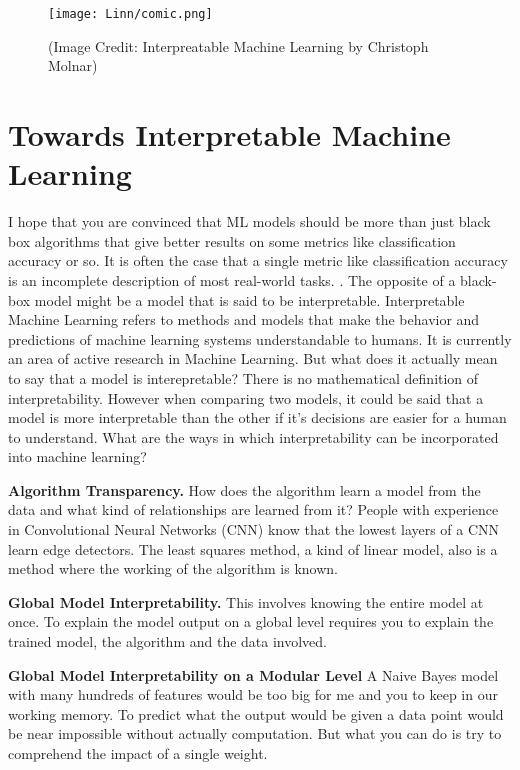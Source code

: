 \documentclass{../template/texnote}
\begin{document}
\begin{figure}[htpb]
    \texttt{[image: Linn/comic.png]}
    \caption{(Image Credit: Interpreatable Machine Learning by Christoph Molnar)}
    \label{fig:comic}
\end{figure}
\section{Towards Interpretable Machine Learning}

I hope that you are convinced that  ML models should be more than just black box algorithms that give better results on some metrics like classification accuracy or so. 
It is often the case that a single metric like classification accuracy is an incomplete description of most real-world tasks.
\cite{doshi-velez_towards_2017}.
\nocite{molnar_interpretable_2019}
The opposite of a black-box model might be a model that is said to be interpretable.
Interpretable Machine Learning refers to methods and models that make the behavior and predictions of machine learning systems understandable to humans.
It is currently an area of active research in Machine Learning.
But what does it actually mean to say that a model is interepretable?
There is no mathematical definition of interpretability. However when comparing two models, it could be said that a model is more interpretable than the other if it's decisions are easier for a human to understand.
What are the ways in which interpretability can be incorporated into machine learning?

\textbf{Algorithm Transparency.} How does the algorithm learn a model from the data and what kind of relationships are learned from it?
People with experience in Convolutional Neural Networks  (CNN) know that the lowest layers of a CNN learn edge detectors.
The least squares method, a kind of linear model, also is a method where the working of the algorithm is known.

\textbf{Global Model Interpretability.}
This involves knowing the entire model at once.
To explain the model output on a global level requires you to explain the trained model, the algorithm and the data involved.

\textbf{Global Model Interpretability on a Modular Level}
A Naive Bayes model with many hundreds of features would be too big for me and you to keep in our working memory.
To predict what the output would be given a data point would be near impossible without actually computation.
But what you can do is try to comprehend the impact of a single weight.
\end{document}
